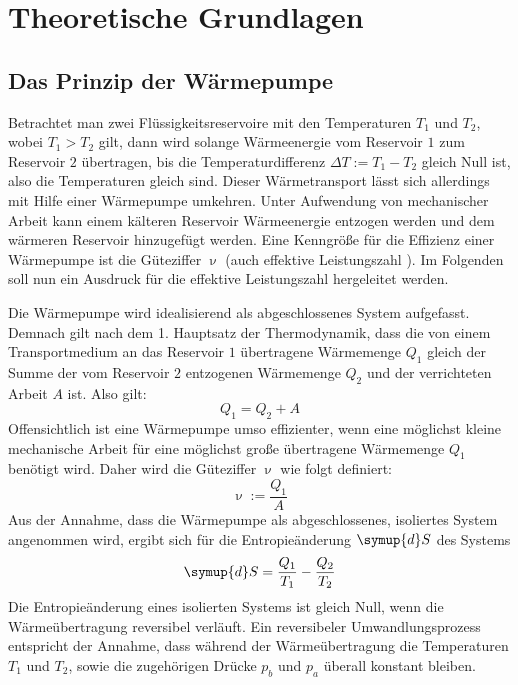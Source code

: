 \section{Theoretische Grundlagen}
\label{sec:Theorie}

\subsection{Das Prinzip der Wärmepumpe}
Betrachtet man zwei Flüssigkeitsreservoire mit den Temperaturen $T_1$ und $T_2$, wobei $T_1 > T_2$ gilt, dann wird solange Wärmeenergie vom Reservoir $1$ zum Reservoir $2$ übertragen, bis die Temperaturdifferenz $\Delta T := T_1 - T_2$ gleich Null ist, also die Temperaturen gleich sind.
Dieser Wärmetransport lässt sich allerdings mit Hilfe einer Wärmepumpe umkehren. Unter Aufwendung von mechanischer Arbeit kann einem kälteren Reservoir Wärmeenergie entzogen werden und dem wärmeren Reservoir hinzugefügt werden.
Eine Kenngröße für die Effizienz einer Wärmepumpe ist die Güteziffer $\upnu$ (auch effektive Leistungszahl \cite{geschke}). Im Folgenden soll nun ein Ausdruck für die effektive Leistungszahl hergeleitet werden.

Die Wärmepumpe wird idealisierend als abgeschlossenes System aufgefasst.
Demnach gilt nach dem 1. Hauptsatz der Thermodynamik, dass die von einem Transportmedium an das Reservoir $1$ übertragene Wärmemenge $Q_1$ gleich der Summe der vom Reservoir $2$ entzogenen Wärmemenge $Q_2$ und der verrichteten Arbeit $A$ ist. Also gilt:
\begin{equation}
	Q_1 = Q_2 + A
\end{equation}
Offensichtlich ist eine Wärmepumpe umso effizienter, wenn eine möglichst kleine mechanische Arbeit für eine möglichst große übertragene Wärmemenge $Q_1$ benötigt wird. Daher wird die Güteziffer $\upnu$ wie folgt definiert:
\begin{equation}
	\upnu := \frac{Q_1}{A}
\end{equation}
Aus der Annahme, dass die Wärmepumpe als abgeschlossenes, isoliertes System angenommen wird, ergibt sich für die Entropieänderung $\symup{d}S$ des Systems
\begin{equation}
	\symup{d}S = \frac{Q_1}{T_1} - \frac{Q_2}{T_2}
\end{equation}
Die Entropieänderung eines isolierten Systems ist gleich Null, wenn die Wärmeübertragung reversibel verläuft. 
Ein reversibeler Umwandlungsprozess entspricht der Annahme, dass während der Wärmeübertragung die Temperaturen $T_1$ und $T_2$, sowie die zugehörigen Drücke $p_b$ und $p_a$ überall konstant bleiben.




